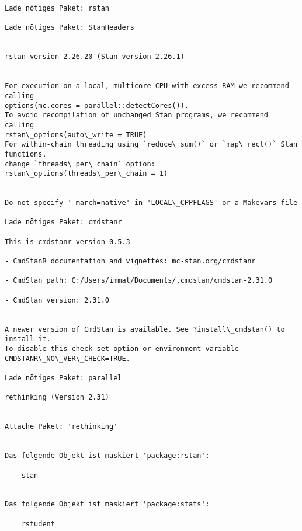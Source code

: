 \documentclass[11pt]{article}
\begin{document}
    \begin{Verbatim}[commandchars=\\\{\}]
Lade nötiges Paket: rstan

Lade nötiges Paket: StanHeaders


rstan version 2.26.20 (Stan version 2.26.1)


For execution on a local, multicore CPU with excess RAM we recommend calling
options(mc.cores = parallel::detectCores()).
To avoid recompilation of unchanged Stan programs, we recommend calling
rstan\_options(auto\_write = TRUE)
For within-chain threading using `reduce\_sum()` or `map\_rect()` Stan functions,
change `threads\_per\_chain` option:
rstan\_options(threads\_per\_chain = 1)


Do not specify '-march=native' in 'LOCAL\_CPPFLAGS' or a Makevars file

Lade nötiges Paket: cmdstanr

This is cmdstanr version 0.5.3

- CmdStanR documentation and vignettes: mc-stan.org/cmdstanr

- CmdStan path: C:/Users/immal/Documents/.cmdstan/cmdstan-2.31.0

- CmdStan version: 2.31.0


A newer version of CmdStan is available. See ?install\_cmdstan() to install it.
To disable this check set option or environment variable
CMDSTANR\_NO\_VER\_CHECK=TRUE.

Lade nötiges Paket: parallel

rethinking (Version 2.31)


Attache Paket: 'rethinking'


Das folgende Objekt ist maskiert 'package:rstan':

    stan


Das folgende Objekt ist maskiert 'package:stats':

    rstudent


    \end{Verbatim}
\end{document}
